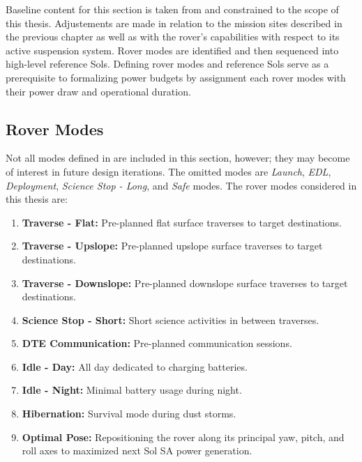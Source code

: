 Baseline content for this section is taken from  and constrained to the scope of this thesis. Adjustements are made in relation to the mission sites described in the previous chapter as well as with the rover's capabilities with respect to its active suspension system. Rover modes are identified and then sequenced into high-level reference Sols. Defining rover modes and reference Sols serve as a prerequisite to formalizing power budgets by assignment each rover modes with their power draw and operational duration.


\subsection{Rover Modes}
\label{sec:ReferenceSols:RoverModes}
Not all modes defined in  are included in this section, however; they may become of interest in future design iterations. The omitted modes are \textit{Launch}, \textit{\ac{EDL}}, \textit{Deployment}, \textit{Science Stop - Long},  and \textit{Safe} modes. The rover modes considered in this thesis are:

\begin{enumerate}[label=\textcolor{BulletBlue}{(\alph*)}]
    \item \textbf{Traverse - Flat:} Pre-planned flat surface traverses to target destinations.
    \item \textbf{Traverse - Upslope:} Pre-planned upslope surface traverses to target destinations.
    \item \textbf{Traverse - Downslope:} Pre-planned downslope surface traverses to target destinations.
    \item \textbf{Science Stop - Short:} Short science activities in between traverses.
    \item \textbf{\ac{DTE} Communication:} Pre-planned communication sessions.
    \item \textbf{Idle - Day:} All day dedicated to charging batteries.
    \item \textbf{Idle - Night:} Minimal battery usage during night.
    \item \textbf{Hibernation:} Survival mode during dust storms.
    \item \textbf{Optimal Pose:} Repositioning the rover along its principal yaw, pitch, and roll axes to maximized next Sol \ac{SA} power generation.
\end{enumerate}

